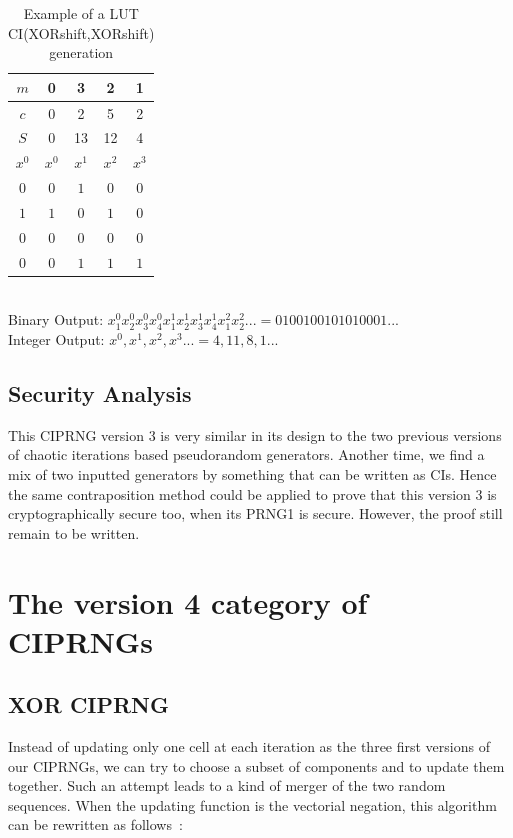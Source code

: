 \begin{tiny}
\begin{table} 
\centering
\begin{tabular}{|c|c|c|c|c|}
\hline
$m$ &0 & 3 &2&1  \\ \hline
$c$  & 0 & 2&5&2\\ \hline
$S$  & 0& 13&12&4  \\ \hline
$x^{0}$ & $x^{0}$ &$x^{1}$ &$x^{2}$& $x^{3}$  \\
$0$ & $0$&$1$ & $0$& $0$\\
$1$ & $1$&$0$ & $1$& $0$\\
$0$ & $0$&$0$ & $0$& $0$ \\
$0$ & $0$&$1$ & $1$& $1$\\
\hline
\end{tabular}\\
\vspace{0.5cm}
Binary Output: $x_1^{0}x_2^{0}x_3^{0}x_4^{0}x_1^{1}x_2^{1}x_3^{1}x_4^{1}x_1^{2}x_2^{2}... = 0100100101010001...$\\
Integer Output:
$x^{0},x^{1},x^{2},x^{3}... = 4,11,8,1...$
\caption{Example of a LUT CI(XORshift,XORshift) generation}
\label{lut table application example}
\end{table}
\end{tiny}

% 
\subsection{Security Analysis}
\label{Security Analysis Version 3 CI}

This CIPRNG version 3 is very similar in its design to the 
two previous versions of chaotic iterations based pseudorandom generators.
Another time, we find a mix of two inputted generators by something
that can be written as CIs.
Hence the same contraposition method could be applied 
to prove that this version 3 is cryptographically 
secure too, when its PRNG1 is secure. However, the proof
still remain to be written.


\section{The version 4 category of CIPRNGs}
\label{new version ci}
\subsection{XOR CIPRNG}
Instead of updating only one cell at each iteration as the three first versions of
our CIPRNGs, we can try to choose a subset of components and to update them together. Such an attempt leads
to a kind of merger of the two random sequences. When the updating function is the vectorial 
negation, this algorithm can be rewritten as follows~\cite{DBLP:journals/corr/abs-1112-5239}:

